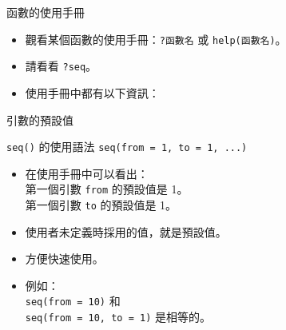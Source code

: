 \documentclass[12pt]{beamer}
\begin{document}
\begin{frame}[fragile]{函數的使用手冊}
\begin{itemize}
\item 觀看某個函數的使用手冊：\verb+?函數名+ 或 \verb+help(函數名)+。
\item 請看看 \verb+?seq+。
\item 使用手冊中都有以下資訊：
\end{itemize}
\end{frame}



\begin{frame}[fragile]{引數的預設值}

\begin{block}{\texttt{seq()} 的使用語法}
\verb+seq(from = 1, to = 1, ...)+ \\
\end{block}
\begin{itemize}
\item 在使用手冊中可以看出：
  \\ 第一個引數 \verb+from+ 的預設值是 1。
  \\ 第一個引數 \verb+to+ 的預設值是 1。
\item 使用者未定義時採用的值，就是預設值。
\item 方便快速使用。
\item 例如：\\
  \verb+seq(from = 10)+ 和 \\
  \verb+seq(from = 10, to = 1)+ 是相等的。
\end{itemize}
\end{frame}
\end{document}
